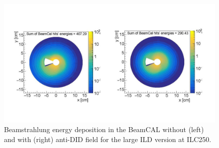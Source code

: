 \begin{figure}[t!]
\includegraphics[width=1.0\hsize]{Integration/fig/BG_beamcal.jpg}
\caption{\label{fig:integration:beamcal}Beamstrahlung energy deposition in the BeamCAL without (left) and with (right) anti-DID field for the large ILD version at ILC250. }
\end{figure}

